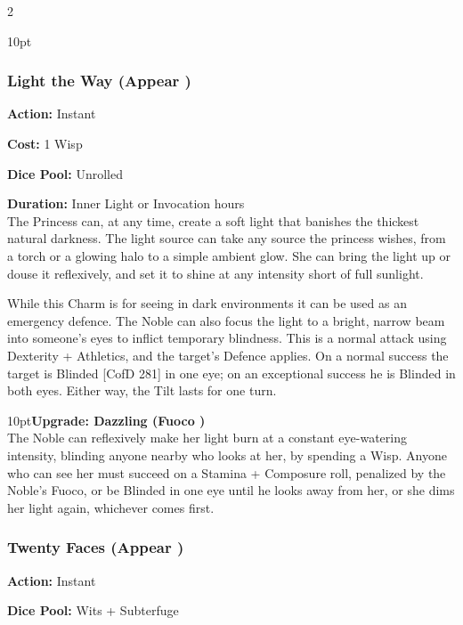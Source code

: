\begin{multicols}{2}
\begin{myindentpar}{10pt}
\end{myindentpar}


\subsubsection*{Light the Way (Appear \textbullet)}

\noindent \textbf{Action:} Instant 

\noindent \textbf{Cost:} 1 Wisp 

\noindent \textbf{Dice Pool:} Unrolled 

\noindent \textbf{Duration:} Inner Light or Invocation hours \\

\noindent The Princess can, at any time, create a soft light that banishes the thickest natural darkness. The light source can take any source the princess wishes, from a torch or a glowing halo to a simple ambient glow. She can bring the light up or douse it reflexively, and set it to shine at any intensity short of full sunlight.

While this Charm is for seeing in dark environments it can be used as an emergency defence. The Noble can also focus the light to a bright, narrow beam into someone’s eyes to inflict temporary blindness. This is a normal attack using Dexterity + Athletics, and the target’s Defence applies. On a normal success
the target is Blinded [CofD 281] in one eye; on an exceptional success he is Blinded in both eyes. Either way, the Tilt lasts for one turn.

\begin{myindentpar}{10pt}\textbf{Upgrade: Dazzling (Fuoco \textbullet)}\\

\noindent The Noble can reflexively make her light burn at a constant eye-watering intensity, blinding anyone nearby who looks at her, by spending a Wisp. Anyone who can see her must succeed on a Stamina + Composure roll, penalized by the Noble’s Fuoco, or be Blinded in one eye until he looks away from her, or she dims her light again, whichever comes first.\end{myindentpar}

\subsubsection*{Twenty Faces (Appear \textbullet)}

\noindent \textbf{Action:} Instant

\noindent \textbf{Dice Pool:} Wits + Subterfuge


\end{multicols}
